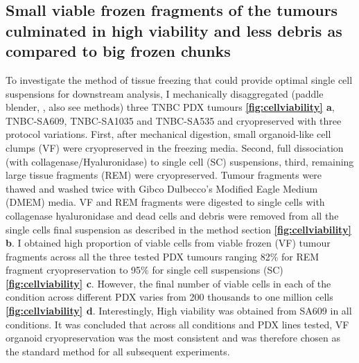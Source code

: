 \subsection{Small viable frozen fragments of the tumours culminated in high viability and less debris as compared to big frozen chunks}
To investigate the method of tissue freezing that could provide optimal single cell suspensions for downstream analysis, I mechanically disaggregated (paddle blender, \cite{eirew2015dynamics}, also see methods) three TNBC PDX tumours \textbf{\autoref{fig:cellviability} a}, TNBC-SA609, TNBC-SA1035 and TNBC-SA535 and cryopreserved with three protocol variations. First, after mechanical digestion, small organoid-like cell clumps (VF) were cryopreserved in the freezing media. Second, full dissociation (with collagenase/Hyaluronidase) to single cell (SC) suspensions, third, remaining large tissue fragments (REM) were cryopreserved. 
Tumour fragments were thawed and washed twice with 
Gibco Dulbecco's Modified Eagle Medium (DMEM) media. VF and REM fragments were digested to single cells with collagenase hyaluronidase and dead cells and debris were removed from all the single cells final suspension as described in the method section \textbf{\autoref{fig:cellviability} b}. I obtained high proportion of viable cells from viable frozen (VF) tumour fragments across all the three tested PDX tumours ranging 82\% for REM fragment cryopreservation to 95\% for single cell suspensions (SC) \textbf{\autoref{fig:cellviability} c}.
However, the final number of viable cells in each of the condition across different PDX varies from 200 thousands to one million cells \textbf{\autoref{fig:cellviability} d}. Interestingly, High viability was obtained from SA609 in all conditions. 
It was concluded that across all conditions and PDX lines tested, VF organoid cryopreservation was the most consistent and was therefore chosen as the standard method for all subsequent experiments.

